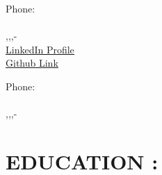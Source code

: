\documentclass{article}
\begin{document}
\begin{flushleft}

\faPhone \hspace{1mm} Phone: \href{tel:\VAR{contact}}{}\\
\faEnvelopeO \hspace{1mm} {\color{red}\underline{\href{mailto:\VAR{email}}{}}} \\
\faHome \hspace{1mm} ,,,- \\ 
\faLinkedin\hspace{1mm}  {\color{red}\underline{\href{\VAR{linkedin}}{LinkedIn Profile}}}\\
\faGithub\hspace{1mm} {\color{red}\underline{\href{\VAR{github}}{Github Link}}}

\end{flushleft}

\begin{flushleft}

\faPhone \hspace{1mm} Phone: \href{tel:\VAR{contact}}{}\\
\faEnvelopeO \hspace{1mm} {\color{red}\underline{\href{mailto:\VAR{email}}{}}} \\
\faHome \hspace{1mm} ,,,-

\end{flushleft}


\vspace{10pt}
\section*{\large{\uppercase{education :}}}

\end{document}
